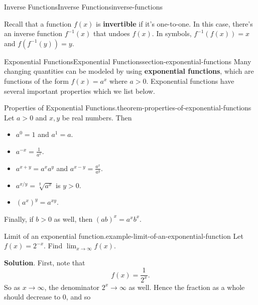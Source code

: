 \documentclass[oneside,10pt,]{book}
\newcommand{\terminology}[1]{\textbf{#1}}
\numberwithin{equation}{section}
\begin{document}
\begin{chapterptx}{Inverse Functions}{}{Inverse Functions}{}{}{inverse-functions}
\begin{introduction}{}%
\hypertarget{p-185}{}%
Recall that a function \(f(x)\) is \terminology{invertible} if it's one-to-one. In this case, there's an inverse function \(f^{-1}(x)\) that undoes \(f(x)\). In symbols, \(f^{-1}(f(x)) = x\) and \(f(f^{-1}(y)) = y\).%
\end{introduction}%
%
%
\typeout{************************************************}
\typeout{************************************************}
%
\begin{sectionptx}{Exponential Functions}{}{Exponential Functions}{}{}{section-exponential-functions}
\hypertarget{p-186}{}%
Many changing quantities can be modeled by using \terminology{exponential functions}, which are functions of the form \(f(x) = a^{x}\) where \(a > 0\). Exponential functions have several important properties which we list below.%
\begin{theorem}{Properties of Exponential Functions.}{}{theorem-properties-of-exponential-functions}%
\hypertarget{p-187}{}%
Let \(a > 0\) and \(x,y\) be real numbers. Then\leavevmode%
\begin{itemize}[label=\textbullet]
\item{}\(a^{0} = 1\) and \(a^{1} = a\).%
\item{}\(a^{-x} = \frac{1}{a^{x}}\).%
\item{}\(a^{x+y} = a^{x}a^{y}\) and \(a^{x-y} = \frac{a^{x}}{a^{y}}\).%
\item{}\(a^{x/y} = \sqrt[y]{a^{x}}\) is \(y > 0\).%
\item{}\((a^{x})^{y} = a^{xy}\).%
\end{itemize}
Finally, if \(b > 0\) as well, then \((ab)^{x} = a^{x}b^{x}\).%
\end{theorem}
\begin{example}{Limit of an exponential function.}{example-limit-of-an-exponential-function}%
\hypertarget{p-188}{}%
Let \(f(x) = 2^{-x}\). Find \(\lim_{x\to\infty}f(x)\).%
\par\smallskip%
\noindent\textbf{Solution}.\hypertarget{solution-42}{}\quad%
\hypertarget{p-189}{}%
First, note that%
\begin{equation*}
f(x) = \frac{1}{2^{x}}.
\end{equation*}
So as \(x\to\infty\), the denominator \(2^{x}\to\infty\) as well. Hence the fraction as a whole should decrease to \(0\), and so%

\end{example}
\end{sectionptx}
\end{chapterptx}
\end{document}
